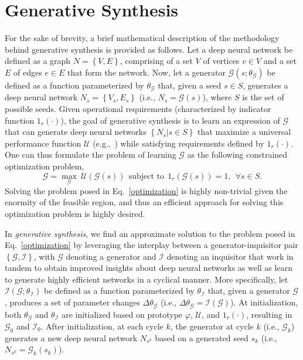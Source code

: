 \documentclass{article}
\begin{document}
\section{Generative Synthesis}
\vspace{-0.15in}
For the sake of brevity, a brief mathematical description of the methodology behind generative synthesis is provided as follows. Let a deep neural network be defined as a graph $N=\left\{V,E\right\}$, comprising of a set $V$ of vertices $v \in V$ and a set $E$ of edges $e \in E$ that form the network.  Now, let a generator $\mathcal{G}(s;\theta_\mathcal{G})$ be defined as a function parameterized by $\theta_\mathcal{G}$ that, given a seed $s  \in S$, generates a deep neural network $N_s=\left\{V_s,E_s\right\}$ (i.e., $N_s = \mathcal{G}(s)$), where $S$ is the set of possible seeds.  Given operational requirements (characterized by indicator function $1_r(\cdot)$), the goal of generative synthesis is to learn an expression of $\mathcal{G}$ that can generate deep neural networks $\left\{N_s|s \in S\right\}$ that maximize a universal performance function $\mathcal{U}$ (e.g.,~\cite{NetScore}) while satisfying requirements defined by $1_r(\cdot)$.  One can thus formulate the problem of learning $\mathcal{G}$ as the following constrained optimization problem,
\vspace{-0.05in}
\begin{equation}
\mathcal{G}  = \max_{\mathcal{G}}~\mathcal{U}(\mathcal{G}(s))~~\textrm{subject~to}~~1_r(\mathcal{G}(s))=1,~~\forall s \in S.
\label{optimization}
\end{equation}
\noindent Solving the problem posed in Eq.~\ref{optimization} is highly non-trivial given the enormity of the feasible region, and thus an efficient approach for solving this optimization problem is highly desired.

In {\it generative synthesis}, we find an approximate solution to the problem posed in Eq.~\ref{optimization} by leveraging the interplay between a generator-inquisitor pair $\left\{\mathcal{G},\mathcal{I}\right\}$, with $\mathcal{G}$ denoting a generator and $\mathcal{I}$ denoting an inquisitor that work in tandem to obtain improved insights about deep neural networks as well as learn to generate highly efficient networks in a cyclical manner.  More specifically, let $\mathcal{I}(\mathcal{G};\theta_\mathcal{I})$ be defined as a function parameterized by $\theta_\mathcal{I}$ that, given a generator $\mathcal{G}$, produces a set of parameter changes $\Delta\theta_\mathcal{G}$ (i.e., $\Delta\theta_\mathcal{G} = \mathcal{I}(\mathcal{G})$).
At initialization, both $\theta_{\mathcal{G}}$ and $\theta_{\mathcal{I}}$ are initialized based on prototype $\varphi$, $\mathcal{U}$, and $1_r(\cdot)$, resulting in $\mathcal{G}_0$ and $\mathcal{I}_0$.  After initialization, at each cycle $k$, the generator at cycle $k$ (i.e., $\mathcal{G}_k$) generates a new deep neural network ${N}_{s^k}$ based on a generated seed $s_k$ (i.e., ${N}_{s^k} = \mathcal{G}_k\left(s_k\right)$).
\end{document}
